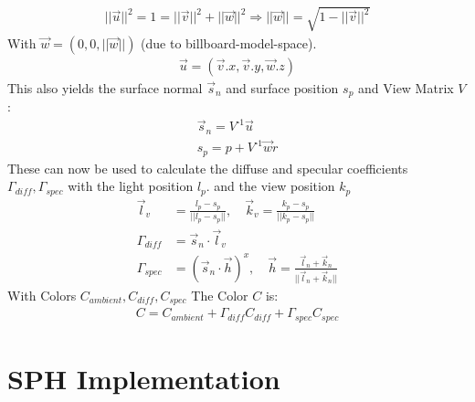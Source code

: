 \documentclass{ACGSeminar}
\begin{document}
\begin{equation} 
\begin{aligned}
||\vec{u}||^2 = 1 = ||\vec{v}||^2 + ||\vec{w}||^2 \Rightarrow ||\vec{w}|| = \sqrt{1 - ||\vec{v}||^2}
\end{aligned}
\end{equation}
With \(\vec{w} = (0,0,||\vec{w}||)\) (due to billboard-model-space).
\begin{equation}
\begin{aligned}
\vec{u} = (\vec{v}.x, \vec{v}.y, \vec{w}.z)
\end{aligned}
\end{equation}
This also yields the surface normal \(\vec{s}_n\) and surface position \(s_p\) and View Matrix \(V\):
\begin{equation}
\begin{aligned}
\vec{s}_n = V^{\text{-}1} \vec{u} \\
s_p = p + V^{\text{-}1} \vec{w} r
\end{aligned}
\end{equation}
These can now be used to calculate the diffuse and specular coefficients \(\Gamma_{diff}, \Gamma_{spec}\) with the light position \(l_{p}\). and the view position \(k_{p}\)
\begin{equation} 
\begin{aligned}
\vec{l}_v &= \frac{l_p - s_p}{||l_p - s_p||}, \quad \vec{k}_v  = \frac{k_p - s_p}{||k_p - s_p||} \\
\Gamma_{diff} &= \vec{s}_n \cdot \vec{l}_v \\
\Gamma_{spec} &= ( \vec{s}_n \cdot \vec{h}) ^ x, \quad \vec{h} = \frac{\vec{l}_n + \vec{k}_n}{||\vec{l}_n + \vec{k}_n||}
\end{aligned}
\end{equation}
With Colors \(C_{ambient}, C_{diff}, C_{spec}\) The Color \(C\) is:
\begin{equation}
\begin{aligned}
C = C_{ambient} + \Gamma_{diff} C_{diff} + \Gamma_{spec} C_{spec}
\end{aligned}
\end{equation}



\section{SPH Implementation}
\end{document}
